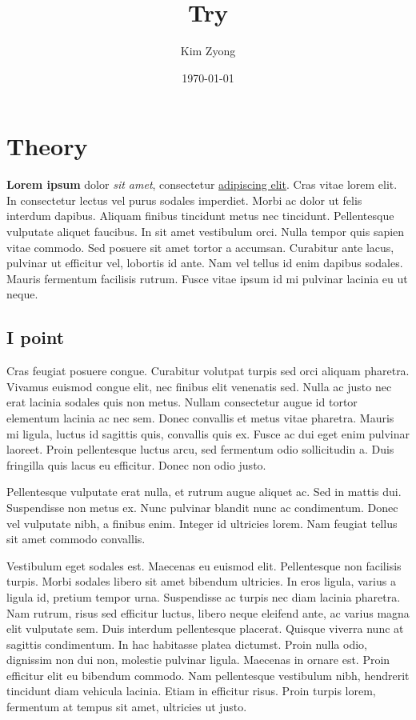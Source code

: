 \documentclass[14px, a4paper]{article}
\title{Try}
\author{Kim Zyong}
\date{\today}
\begin{document}
	\maketitle
	
	\section{Theory}
	\textbf{Lorem ipsum} dolor \textit{sit amet}, consectetur \underline{adipiscing elit}. Cras vitae lorem elit. In consectetur lectus vel purus sodales imperdiet. Morbi ac dolor ut felis interdum dapibus. Aliquam finibus tincidunt metus nec tincidunt. Pellentesque vulputate aliquet faucibus. In sit amet vestibulum orci. Nulla tempor quis sapien vitae commodo. Sed posuere sit amet tortor a accumsan. Curabitur ante lacus, pulvinar ut efficitur vel, lobortis id ante. Nam vel tellus id enim dapibus sodales. Mauris fermentum facilisis rutrum. Fusce vitae ipsum id mi pulvinar lacinia eu ut neque.
	\subsection{I point}
	Cras feugiat posuere congue. Curabitur volutpat turpis sed orci aliquam pharetra. Vivamus euismod congue elit, nec finibus elit venenatis sed. Nulla ac justo nec erat lacinia sodales quis non metus. Nullam consectetur augue id tortor elementum lacinia ac nec sem. Donec convallis et metus vitae pharetra. Mauris mi ligula, luctus id sagittis quis, convallis quis ex. Fusce ac dui eget enim pulvinar laoreet. Proin pellentesque luctus arcu, sed fermentum odio sollicitudin a. Duis fringilla quis lacus eu efficitur. Donec non odio justo.
	
	Pellentesque vulputate erat nulla, et rutrum augue aliquet ac. Sed in mattis dui. Suspendisse non metus ex. Nunc pulvinar blandit nunc ac condimentum. Donec vel vulputate nibh, a finibus enim. Integer id ultricies lorem. Nam feugiat tellus sit amet commodo convallis.
	
	Vestibulum eget sodales est. Maecenas eu euismod elit. Pellentesque non facilisis turpis. Morbi sodales libero sit amet bibendum ultricies. In eros ligula, varius a ligula id, pretium tempor urna. Suspendisse ac turpis nec diam lacinia pharetra. Nam rutrum, risus sed efficitur luctus, libero neque eleifend ante, ac varius magna elit vulputate sem. Duis interdum pellentesque placerat. Quisque viverra nunc at sagittis condimentum. In hac habitasse platea dictumst. Proin nulla odio, dignissim non dui non, molestie pulvinar ligula. Maecenas in ornare est. Proin efficitur elit eu bibendum commodo. Nam pellentesque vestibulum nibh, hendrerit tincidunt diam vehicula lacinia. Etiam in efficitur risus. Proin turpis lorem, fermentum at tempus sit amet, ultricies ut justo.
	
\end{document}
